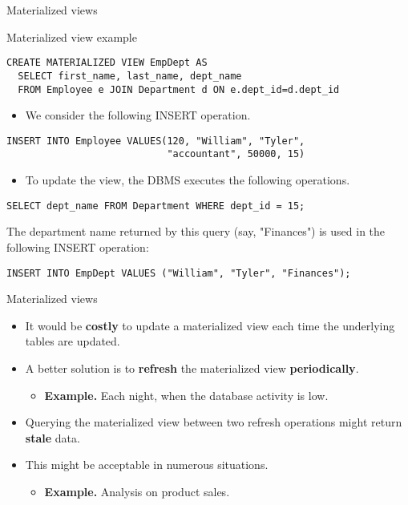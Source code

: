 \documentclass[xcolor=table]{beamer}
\begin{document}
\begin{frame}[fragile]{Materialized views}
  \begin{block}{Materialized view example}
    \footnotesize
\begin{verbatim}
CREATE MATERIALIZED VIEW EmpDept AS
  SELECT first_name, last_name, dept_name
  FROM Employee e JOIN Department d ON e.dept_id=d.dept_id
\end{verbatim}
  \end{block}
\vfill
\begin{itemize}
  \item We consider the following INSERT operation.
\end{itemize}
\begin{exampleblock}{}
  \footnotesize
  \begin{verbatim}
INSERT INTO Employee VALUES(120, "William", "Tyler", 
                            "accountant", 50000, 15)
\end{verbatim}
\end{exampleblock}
\vfill
\begin{itemize}
  \item To update the view, the DBMS executes the 
  following operations.
\end{itemize}
\vfill
\begin{block}{}
  \footnotesize{
\begin{verbatim}
SELECT dept_name FROM Department WHERE dept_id = 15;
\end{verbatim}
}

The department name returned by this query (say, "Finances") is used 
in the following INSERT operation:

\footnotesize{\begin{verbatim}
INSERT INTO EmpDept VALUES ("William", "Tyler", "Finances");
\end{verbatim}
}


\end{block}
\end{frame}

\begin{frame}{Materialized views}
  \begin{itemize}
    \item It would be {\bf costly} to update a materialized view 
    each time the underlying tables are updated.
    \vfill
    \item A better solution is to {\bf refresh} the materialized view
    {\bf periodically}.
    \begin{itemize}
      \item {\bf Example.} Each night, when the database activity is low.
    \end{itemize}
    \vfill
    \item Querying the materialized view between two refresh operations might 
    return {\bf stale} data.
    \vfill
    \item This might be acceptable in numerous situations.
    \begin{itemize}
      \item {\bf Example.} Analysis on product sales.
    \end{itemize}
  \end{itemize}
\end{frame}
\end{document}

